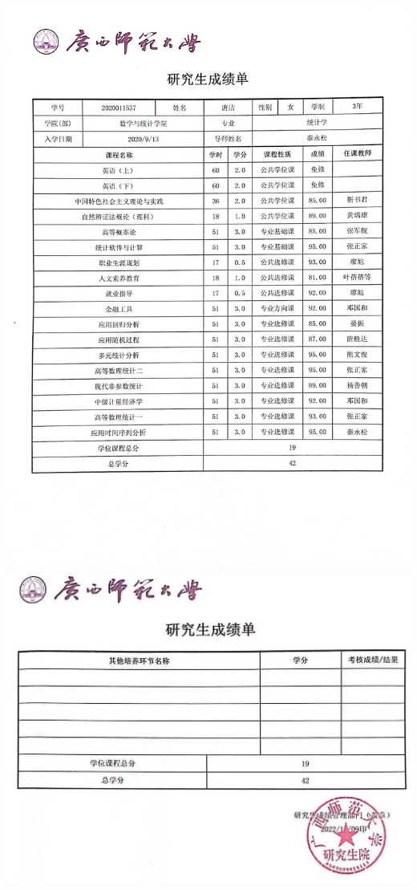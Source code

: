 \documentclass[UFT8]{ctexart}%
\begin{document}
\begin{center}
  \includegraphics[scale=0.4]{figs/硕士成绩单1.JPG }
  \includegraphics[scale=0.35]{figs/硕士成绩单2.JPG }
  
   
\end{center}
\end{document}

